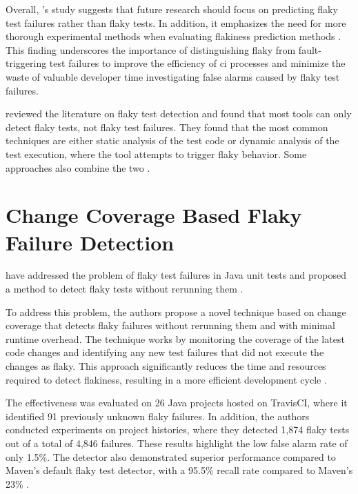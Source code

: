 Overall, \citeauthor*{haben_importance_2023}'s study suggests that future research should focus on predicting flaky test failures rather than flaky tests.
In addition, it emphasizes the need for more thorough experimental methods when evaluating flakiness prediction methods \autocite{haben_importance_2023}.
This finding underscores the importance of distinguishing flaky from fault-triggering test failures to improve the efficiency of \ac{ci} processes and minimize the waste of valuable developer time investigating false alarms caused by flaky test failures.

 reviewed the literature on flaky test detection and found that most tools can only detect flaky tests, not flaky test failures.
They found that the most common techniques are either static analysis of the test code or dynamic analysis of the test execution, where the tool attempts to trigger flaky behavior.
Some approaches also combine the two \autocite{rasheed_test_2022}.
\section{Change Coverage Based Flaky Failure Detection}

 have addressed the problem of flaky test failures in Java unit tests and proposed a method to detect flaky tests without rerunning them \autocite{bell_deflaker_2018}.

To address this problem, the authors propose a novel technique based on change coverage that detects flaky failures without rerunning them and with minimal runtime overhead.
The technique works by monitoring the coverage of the latest code changes and identifying any new test failures that did not execute the changes as flaky.
This approach significantly reduces the time and resources required to detect flakiness, resulting in a more efficient development cycle \autocite{bell_deflaker_2018}.

The effectiveness was evaluated on 26 Java projects hosted on TravisCI, where it identified 91 previously unknown flaky failures.
In addition, the authors conducted experiments on project histories, where they detected 1,874 flaky tests out of a total of 4,846 failures.
These results highlight the low false alarm rate of only 1.5\%.
The detector also demonstrated superior performance compared to Maven's default flaky test detector, with a 95.5\% recall rate compared to Maven's 23\% \autocite{bell_deflaker_2018}.

